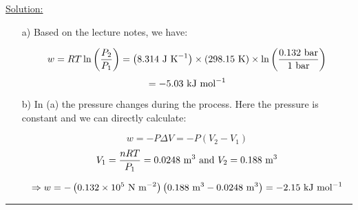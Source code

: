 \noindent
\underline{Solution:}\\

\begin{itemize}
\item[a)] Based on the lecture notes, we have:

$$w = RT\ln\left(\frac{P_2}{P_1}\right) = \left(8.314\textnormal{ J K}^{-1}\right)\times\left(298.15\textnormal{ K}\right)\times\ln\left(\frac{0.132\textnormal{ bar}}{1\textnormal{ bar}}\right)$$
$$ = -5.03\textnormal{ kJ mol}^{-1}$$

\item[b)] In (a) the pressure changes during the process. Here the pressure is constant and we can directly calculate:

$$w = -P\Delta V = -P\left(V_2 - V_1\right)$$
$$V_1 = \frac{nRT}{P_1} = 0.0248\textnormal{ m}^3\textnormal{ and }V_2 = 0.188\textnormal{ m}^3$$

$$\Rightarrow w = -\left(0.132\times 10^5\textnormal{ N m}^{-2}\right)\left(0.188\textnormal{ m}^3 - 0.0248\textnormal{ m}^3\right) = -2.15\textnormal{ kJ mol}^{-1}$$

\end{itemize}

\hrule\vspace{0.5cm}
